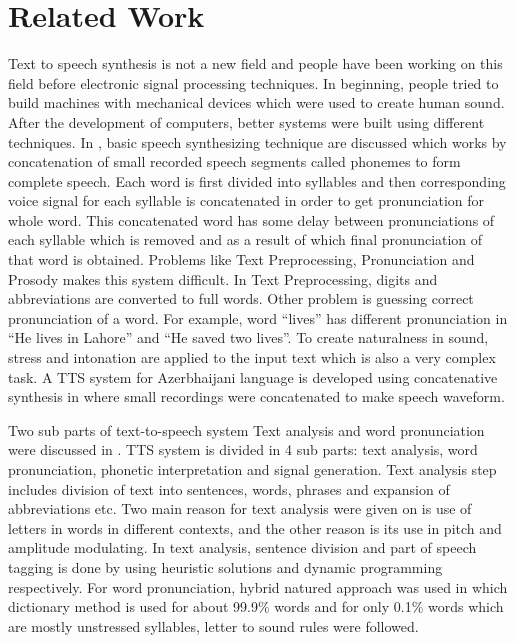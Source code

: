 \chapter{Related Work}

Text to speech synthesis is not a new field and people have been working on this field before electronic
signal processing techniques. In beginning, people tried to build machines with mechanical devices which were used to
create human sound. After the development of computers, better systems were built using different
techniques. In \cite{swetha2013text}, basic speech synthesizing technique are discussed 
which works by concatenation of small recorded speech segments called phonemes to form
complete speech. Each word is first divided into syllables and then corresponding voice signal for each syllable
is concatenated in order to get pronunciation for whole word. This concatenated word has some
delay between pronunciations of each syllable which is removed and as a result of which final
pronunciation of that word is obtained. Problems like Text Preprocessing, Pronunciation and
Prosody makes this system difficult. In Text Preprocessing, digits and abbreviations are converted to full
words. Other problem is guessing correct pronunciation of a word. For example, word “lives” has
different pronunciation in “He lives in Lahore” and “He saved two lives”. To create naturalness in
sound, stress and intonation are applied to the input text which is also a very complex task. A TTS system for Azerbhaijani language is developed using concatenative
synthesis in \cite{aida2010main} where small recordings were concatenated to make speech waveform.

Two sub parts of text-to-speech system Text analysis and word pronunciation were discussed in \cite{liberman1992text}. 
TTS system is divided in 4 sub parts: text analysis, word pronunciation, phonetic interpretation and signal
generation. Text analysis step includes division of text into sentences, words, phrases and expansion of abbreviations etc.
Two main reason for text analysis were given on is use of letters in words in different contexts, and the other reason is its use
in pitch and amplitude modulating. In text analysis, sentence division and part of speech tagging is done by using heuristic solutions \cite{riley1989some}
and dynamic programming respectively. For word pronunciation, hybrid natured approach was used in which dictionary method is used for about 99.9\%
words and for only 0.1\% words which are mostly unstressed syllables, letter to sound rules were followed. 

